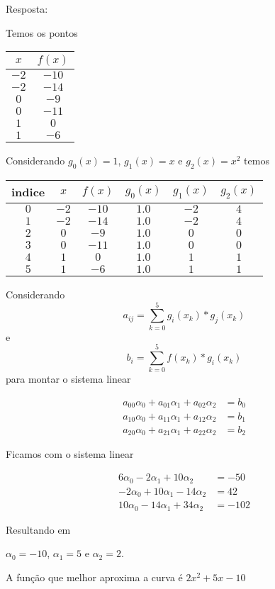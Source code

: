 \documentclass[12pt]{article}
\begin{document}
\begin{enumerate}
Resposta: 

Temos os pontos 

\begin{tabular}{ |c|c| } 
 \hline
  $x$ & $f(x)$ \\ \hline
 $-2$ & $-10$  \\ \hline
 $-2$ & $-14$  \\ \hline 
 $ 0$ & $-9$   \\ \hline 
 $ 0$ & $-11$  \\ \hline 
 $ 1$ & $ 0$   \\ \hline 
 $ 1$ & $-6$   \\ \hline  
\end{tabular}


Considerando $g_0(x) = 1$, $g_1(x) = x$ e $g_2(x) = x^2$ temos


\begin{tabular}{ |c|c|c|c|c|c| } 
 \hline
 indice &  $x$ & $f(x)$ & $g_0(x)$ & $g_1(x)$ & $g_2(x)$ \\ \hline
 $0$ & $-2$ & $-10$ & $1.0$ & $-2$ & $4$ \\ \hline
 $1$ & $-2$ & $-14$ & $1.0$ & $-2$ & $4$ \\ \hline
 $2$ &  $0$ &  $-9$ & $1.0$ &  $0$ & $0$ \\ \hline
 $3$ &  $0$ & $-11$ & $1.0$ &  $0$ & $0$ \\ \hline
 $4$ &  $1$ &   $0$ & $1.0$ &  $1$ & $1$ \\ \hline
 $5$ &  $1$ &  $-6$ & $1.0$ &  $1$ & $1$ \\ \hline
\end{tabular}

Considerando 
\[a_{ij} = \sum_{k=0}^5 g_i(x_k)*g_j(x_k)\]
e 
\[b_i = \sum_{k=0}^5 f(x_k)*g_i(x_k)\]
para montar o sistema linear 


\begin{align*} 
a_{00}\alpha_0 + a_{01}\alpha_1 + a_{02}\alpha_2  &=  b_0 \\ 
a_{10}\alpha_0 + a_{11}\alpha_1 + a_{12}\alpha_2  &=  b_1 \\ 
a_{20}\alpha_0 + a_{21}\alpha_1 + a_{22}\alpha_2  &=  b_2 
\end{align*}

Ficamos com o sistema linear 

\begin{align*} 
  6 \alpha_0 -  2 \alpha_1 + 10 \alpha_2  &=  -50    \\ 
 -2 \alpha_0 + 10 \alpha_1 - 14 \alpha_2  &=   42   \\ 
 10 \alpha_0 - 14 \alpha_1 + 34 \alpha_2  &= -102 
\end{align*}

Resultando em 

$\alpha_0 = -10$, 
$\alpha_1 = 5$ e 
$\alpha_2 = 2$.

A função que melhor aproxima a curva é $2x^2 + 5x - 10$



\end{enumerate}
\end{document}
